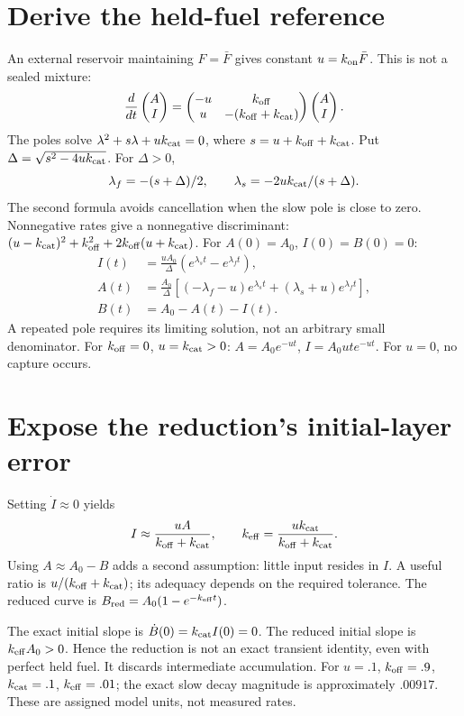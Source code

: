 \section{Derive the held-fuel reference}
An external reservoir maintaining $F=\bar F$ gives constant
$u=k_{\rm on}\bar F$. This is not a sealed mixture:
\[
 \frac{d}{dt}\begin{pmatrix}A\\I\end{pmatrix}
 =
 \begin{pmatrix}-u&k_{\rm off}\\u&-(k_{\rm off}+k_{\rm cat})\end{pmatrix}
 \begin{pmatrix}A\\I\end{pmatrix}.
\]
The poles solve
$\lambda^2+s\lambda+u k_{\rm cat}=0$, where
$s=u+k_{\rm off}+k_{\rm cat}$. Put
$\Delta=\sqrt{s^2-4u k_{\rm cat}}$. For $\Delta>0$,
\[
 \lambda_f=-(s+\Delta)/2,\qquad
 \lambda_s=-2u k_{\rm cat}/(s+\Delta).
\]
The second formula avoids cancellation when the slow pole is close to zero.
Nonnegative rates give a nonnegative discriminant:
$(u-k_{\rm cat})^2+k_{\rm off}^2+2k_{\rm off}(u+k_{\rm cat})$.
For $A(0)=A_0$, $I(0)=B(0)=0$:
\begin{align}
 I(t)&=\frac{uA_0}{\Delta}(e^{\lambda_s t}-e^{\lambda_f t}),\\
 A(t)&=\frac{A_0}{\Delta}
 [(-\lambda_f-u)e^{\lambda_s t}+(\lambda_s+u)e^{\lambda_f t}],\\
 B(t)&=A_0-A(t)-I(t).
\end{align}
A repeated pole requires its limiting solution, not an arbitrary small
denominator. For $k_{\rm off}=0$, $u=k_{\rm cat}>0$:
$A=A_0e^{-ut}$, $I=A_0ut e^{-ut}$. For $u=0$, no capture occurs.

\section{Expose the reduction's initial-layer error}
Setting $\dot I\approx0$ yields
\[
 I\approx \frac{uA}{k_{\rm off}+k_{\rm cat}},\qquad
 k_{\rm eff}=\frac{u k_{\rm cat}}{k_{\rm off}+k_{\rm cat}}.
\]
Using $A\approx A_0-B$ adds a second assumption: little input resides in
$I$. A useful ratio is $u/(k_{\rm off}+k_{\rm cat})$; its adequacy depends on
the required tolerance. The reduced curve is
$B_{\rm red}=A_0(1-e^{-k_{\rm eff}t})$.

The exact initial slope is $\dot B(0)=k_{\rm cat}I(0)=0$. The reduced initial
slope is $k_{\rm eff}A_0>0$. Hence the reduction is not an exact transient
identity, even with perfect held fuel. It discards intermediate accumulation.
For $u=.1$, $k_{\rm off}=.9$, $k_{\rm cat}=.1$, $k_{\rm eff}=.01$;
the exact slow decay magnitude is approximately $.00917$.
These are assigned model units, not measured rates.
\begin{center}\end{center}

